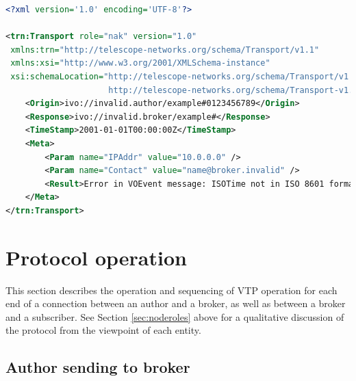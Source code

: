 \documentclass[a4paper,11pt]{ivoa}
\begin{document}
\begin{lstlisting}[language=XML,label=lst:nak,
                   caption=Sample VOEvent message receipt response indicating unsuccessful transmission (\xmlel{nak}).]
<?xml version='1.0' encoding='UTF-8'?>

<trn:Transport role="nak" version="1.0"
 xmlns:trn="http://telescope-networks.org/schema/Transport/v1.1"
 xmlns:xsi="http://www.w3.org/2001/XMLSchema-instance"
 xsi:schemaLocation="http://telescope-networks.org/schema/Transport/v1.1
                     http://telescope-networks.org/schema/Transport-v1.1.xsd">
    <Origin>ivo://invalid.author/example#0123456789</Origin>
    <Response>ivo://invalid.broker/example#</Response>
    <TimeStamp>2001-01-01T00:00:00Z</TimeStamp>
    <Meta>
        <Param name="IPAddr" value="10.0.0.0" />
        <Param name="Contact" value="name@broker.invalid" />
        <Result>Error in VOEvent message: ISOTime not in ISO 8601 format</Result>
    </Meta>
</trn:Transport>
\end{lstlisting}

\section{Protocol operation}
\label{sec:protocol}

This section describes the operation and sequencing of VTP operation for each
end of a connection between an author and a broker, as well as between a
broker and a subscriber. See Section \ref{sec:noderoles} above for a
qualitative discussion of the protocol from the viewpoint of each entity.

\subsection{Author sending to broker}
\label{sec:protocol:authortobroker}
\end{document}
